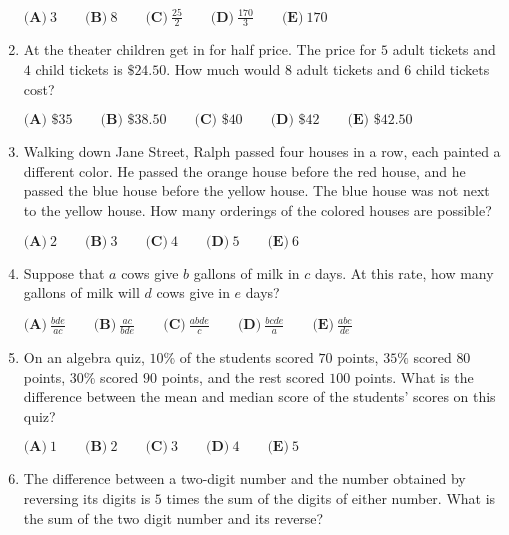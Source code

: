 \documentclass{article}
\begin{document}
\begin{enumerate}[label=\arabic*., itemsep=0.5em]
\( \textbf{(A)}\ 3\qquad\textbf{(B)}\ 8\qquad\textbf{(C)}\ \frac{25}{2}\qquad\textbf{(D)}\ \frac{170}{3}\qquad\textbf{(E)}\ 170\)\par \vspace{0.5em}\item At the theater children get in for half price.  The price for \(5\) adult tickets and \(4\) child tickets is \(\$24.50\).  How much would \(8\) adult tickets and \(6\) child tickets cost?

\(\textbf{(A) }\$35\qquad
\textbf{(B) }\$38.50\qquad
\textbf{(C) }\$40\qquad
\textbf{(D) }\$42\qquad
\textbf{(E) }\$42.50\)\par \vspace{0.5em}\item Walking down Jane Street, Ralph passed four houses in a row, each painted a different color. He passed the orange house before the red house, and he passed the blue house before the yellow house. The blue house was not next to the yellow house. How many orderings of the colored houses are possible?

\( \textbf{(A)}\ 2\qquad\textbf{(B)}\ 3\qquad\textbf{(C)}\ 4\qquad\textbf{(D)}\ 5\qquad\textbf{(E)}\ 6\)\par \vspace{0.5em}\item Suppose that \(a\) cows give \(b\) gallons of milk in \(c\) days. At this rate, how many gallons of milk will \(d\) cows give in \(e\) days?

\( \textbf{(A)}\ \frac{bde}{ac}\qquad\textbf{(B)}\ \frac{ac}{bde}\qquad\textbf{(C)}\ \frac{abde}{c}\qquad\textbf{(D)}\ \frac{bcde}{a}\qquad\textbf{(E)}\ \frac{abc}{de}\)\par \vspace{0.5em}\item On an algebra quiz, \(10\%\) of the students scored \(70\) points, \(35\%\) scored \(80\) points, \(30\%\) scored \(90\) points, and the rest scored \(100\) points. What is the difference between the mean and median score of the students' scores on this quiz?

\( \textbf{(A)}\ 1\qquad\textbf{(B)}\ 2\qquad\textbf{(C)}\ 3\qquad\textbf{(D)}\ 4\qquad\textbf{(E)}\ 5\)\par \vspace{0.5em}\item The difference between a two-digit number and the number obtained by reversing its digits is \(5\) times the sum of the digits of either number.  What is the sum of the two digit number and its reverse?


\end{enumerate}
\end{document}
